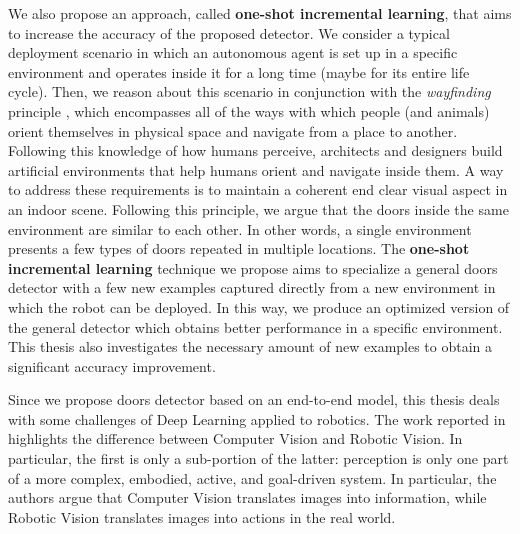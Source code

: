 We also propose an approach, called \textbf{one-shot incremental learning}, that aims to increase the accuracy of the proposed detector. We consider a typical deployment scenario in which an autonomous agent is set up in a specific environment and operates inside it for a long time (maybe for its entire life cycle). Then, we reason about this scenario in  conjunction with the \textit{wayfinding} principle \cite{wayfinding, imageofcity}, which encompasses all of the ways with which people (and animals) orient themselves in physical space and navigate from a place to another. Following this knowledge of how humans perceive, architects and designers build artificial environments that help humans orient and navigate inside them. A way to address these requirements is to maintain a coherent end clear visual aspect in an indoor scene. Following this principle, we argue that the doors inside the same environment are similar to each other. In other words, a single environment presents a few types of doors repeated in multiple locations.  The \textbf{one-shot incremental learning} technique we propose aims to specialize a general doors detector with a few new examples captured directly from a new environment in which the robot can be deployed. In this way, we produce an optimized version of the general detector which obtains better performance in a specific environment. This thesis also investigates the necessary amount of new examples to obtain a significant accuracy improvement.

Since we propose doors detector based on an end-to-end model, this thesis deals with some challenges of Deep Learning applied to robotics. The work reported in \cite{surveydeeplimits} highlights the difference between Computer Vision and Robotic Vision. In particular, the first is only a sub-portion of the latter: perception is only one part of a more complex, embodied, active, and goal-driven system. In particular, the authors argue that Computer Vision translates images into information, while Robotic Vision translates images into actions in the real world.

